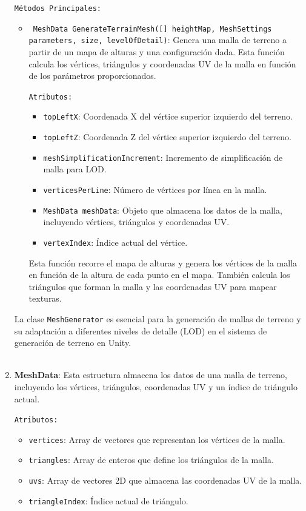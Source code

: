 \begin{enumerate}
    \texttt{Métodos Principales:}

    \begin{itemize}
        \item \texttt{ MeshData GenerateTerrainMesh([] heightMap, MeshSettings parameters,  size,  levelOfDetail)}: Genera una malla de terreno a partir de un mapa de alturas y una configuración dada. Esta función calcula los vértices, triángulos y coordenadas UV de la malla en función de los parámetros proporcionados.

        \texttt{Atributos:}

        \begin{itemize}
            \item \texttt{topLeftX}: Coordenada X del vértice superior izquierdo del terreno.
            \item \texttt{topLeftZ}: Coordenada Z del vértice superior izquierdo del terreno.
            \item \texttt{meshSimplificationIncrement}: Incremento de simplificación de malla para LOD.
            \item \texttt{verticesPerLine}: Número de vértices por línea en la malla.
            \item \texttt{MeshData meshData}: Objeto que almacena los datos de la malla, incluyendo vértices, triángulos y coordenadas UV.
            \item \texttt{vertexIndex}: Índice actual del vértice.
        \end{itemize}

        Esta función recorre el mapa de alturas y genera los vértices de la malla en función de la altura de cada punto en el mapa. También calcula los triángulos que forman la malla y las coordenadas UV para mapear texturas.
    \end{itemize}

    La clase \texttt{MeshGenerator} es esencial para la generación de mallas de terreno y su adaptación a diferentes niveles de detalle (LOD) en el sistema de generación de terreno en Unity.\\
    \\

    \item \textbf{MeshData}: Esta estructura almacena los datos de una malla de terreno, incluyendo los vértices, triángulos, coordenadas UV y un índice de triángulo actual.

    \texttt{Atributos:}

    \begin{itemize}
        \item \texttt{vertices}: Array de vectores que representan los vértices de la malla.
        \item \texttt{triangles}: Array de enteros que define los triángulos de la malla.
        \item \texttt{uvs}: Array de vectores 2D que almacena las coordenadas UV de la malla.
        \item \texttt{triangleIndex}: Índice actual de triángulo.
    \end{itemize}


\end{enumerate}
